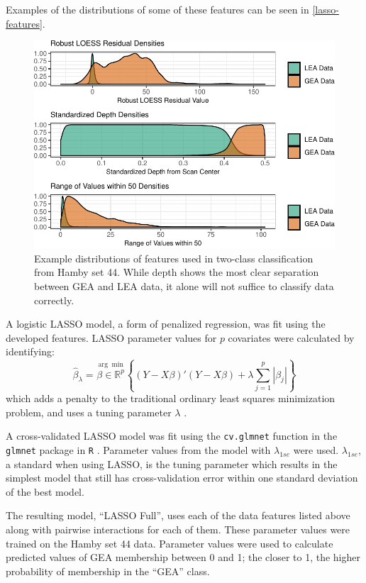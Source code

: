 \documentclass[12pt]{article}
\begin{document}
Examples of the distributions of some of these features can be seen in
\autoref{lasso-features}.

\begin{figure}
\centering
\includegraphics{writeup_files/figure-latex/lasso-features-1.pdf}
\caption{\label{lasso-features}Example distributions of features used in
two-class classification from Hamby set 44. While depth shows the most
clear separation between GEA and LEA data, it alone will not suffice to
classify data correctly.}
\end{figure}

A logistic LASSO model, a form of penalized regression, was fit using
the developed features. LASSO parameter values for \(p\) covariates were
calculated by identifying:\\
\[
\hat{\beta}_{\lambda} = \stackrel{\arg\min}{\beta \in \mathbb{R}^p} \left\{  (Y - X\beta)'(Y - X\beta) + \lambda \sum_{j=1}^{p}|\beta_j|\right\}
\] which adds a penalty to the traditional ordinary least squares
minimization problem, and uses a tuning parameter \(\lambda\)
\citep{LASSO}.

A cross-validated LASSO model was fit using the \texttt{cv.glmnet}
function in the \texttt{glmnet} package in \texttt{R} \cite{glmnet}.
Parameter values from the model with \(\lambda_{1se}\) were used.
\(\lambda_{1se}\), a standard when using LASSO, is the tuning parameter
which results in the simplest model that still has cross-validation
error within one standard deviation of the best model.

The resulting model, ``LASSO Full'', uses each of the data features
listed above along with pairwise interactions for each of them. These
parameter values were trained on the Hamby set 44 data. Parameter values
were used to calculate predicted values of GEA membership between 0 and
1; the closer to 1, the higher probability of membership in the ``GEA''
class.
\end{document}
